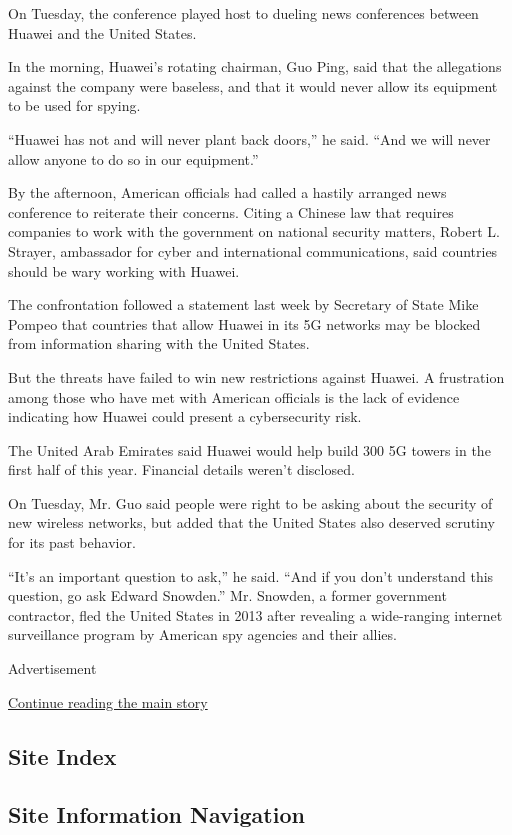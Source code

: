 On Tuesday, the conference played host to dueling news conferences
between Huawei and the United States.

In the morning, Huawei's rotating chairman, Guo Ping, said that the
allegations against the company were baseless, and that it would never
allow its equipment to be used for spying.

``Huawei has not and will never plant back doors,'' he said. ``And we
will never allow anyone to do so in our equipment.''

By the afternoon, American officials had called a hastily arranged news
conference to reiterate their concerns. Citing a Chinese law that
requires companies to work with the government on national security
matters, Robert L. Strayer, ambassador for cyber and international
communications, said countries should be wary working with Huawei.

The confrontation followed a statement last week by Secretary of State
Mike Pompeo that countries that allow Huawei in its 5G networks may be
blocked from information sharing with the United States.

But the threats have failed to win new restrictions against Huawei. A
frustration among those who have met with American officials is the lack
of evidence indicating how Huawei could present a cybersecurity risk.

The United Arab Emirates said Huawei would help build 300 5G towers in
the first half of this year. Financial details weren't disclosed.

On Tuesday, Mr. Guo said people were right to be asking about the
security of new wireless networks, but added that the United States also
deserved scrutiny for its past behavior.

``It's an important question to ask,'' he said. ``And if you don't
understand this question, go ask Edward Snowden.'' Mr. Snowden, a former
government contractor, fled the United States in 2013 after revealing a
wide-ranging internet surveillance program by American spy agencies and
their allies.

Advertisement

\protect\hyperlink{after-bottom}{Continue reading the main story}

\hypertarget{site-index}{%
\subsection{Site Index}\label{site-index}}

\hypertarget{site-information-navigation}{%
\subsection{Site Information
Navigation}\label{site-information-navigation}}

